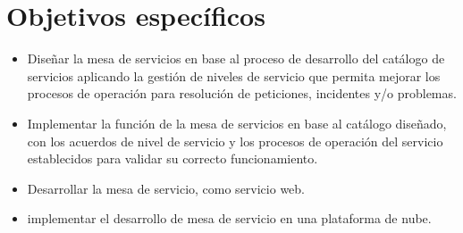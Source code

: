 \section{Objetivos específicos} %
\begin{itemize}
	
\item Diseñar la mesa de servicios en base al proceso de desarrollo del catálogo de servicios  aplicando la gestión de niveles de servicio que permita mejorar los procesos de operación para  resolución de peticiones, incidentes y/o problemas.

\item Implementar la función de la mesa de servicios en base al catálogo diseñado, con los acuerdos 
de nivel de servicio y los procesos de operación del servicio establecidos para validar su 
correcto funcionamiento.

\item Desarrollar la mesa de servicio, como servicio web.

\item implementar el desarrollo de mesa de servicio en una plataforma de nube.
\end{itemize}



